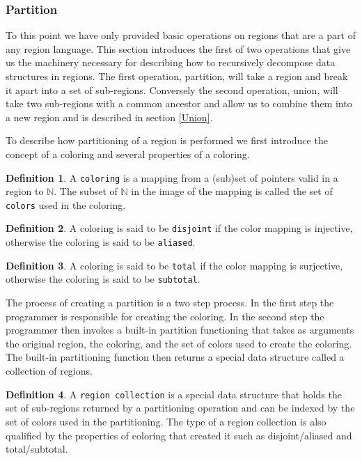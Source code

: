 \documentclass{article}
\theoremstyle{definition}
\newtheorem{definition}{Definition}
\begin{document}
\subsubsection{Partition \label{Partition}}
\noindent
To this point we have only provided basic operations on regions that are a part of
any region language.  This section introduces the first of two operations that give us the
machinery necessary for describing how to recursively decompose data structures in
regions.  The first operation, partition, will take a region and break
it apart into a set of sub-regions.  Conversely the second operation, union, will
take two sub-regions with a common ancestor and allow us to combine them into a
new region and is described in section \ref{Union}. 

\noindent
To describe how partitioning of a region is performed we first introduce the
concept of a coloring and several properties of a coloring.

\begin{definition}
A {\tt coloring} is a mapping from a (sub)set of pointers valid in a region
to $\mathbb{N}$.  The subset of $\mathbb{N}$ in the image of the mapping
is called the set of {\tt colors} used in the coloring.
\end{definition}

\begin{definition}
A coloring is said to be {\tt disjoint} if the color mapping is injective, otherwise
the coloring is said to be {\tt aliased}.
\end{definition}

\begin{definition}
A coloring is said to be {\tt total} if the color mapping is surjective, otherwise
the coloring is said to be {\tt subtotal}.
\end{definition}

\noindent
The process of creating a partition is a two step process.  In the first
step the programmer is responsible for creating the coloring.  In the second step
the programmer then invokes a built-in partition functioning that takes as
arguments the original region, the coloring, and the set of colors used to
create the coloring.  The built-in partitioning function then returns a
special data structure called a collection of regions.

\begin{definition}
A {\tt region collection} is a special data structure that holds the set
of sub-regions returned by a partitioning operation and can be indexed by
the set of colors used in the partitioning.  The type of a region collection
is also qualified by the properties of coloring that created it such
as disjoint/aliased and total/subtotal. 
\end{definition}
\end{document}
